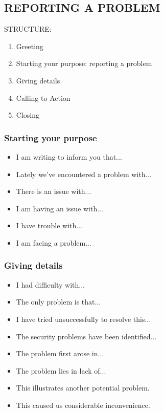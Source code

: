 \subsection{REPORTING A PROBLEM}

STRUCTURE:
\begin{enumerate}
\item Greeting
\item Starting your purpose: reporting a problem
\item Giving details
\item Calling to Action
\item Closing
\end{enumerate}
\subsubsection{Starting your purpose}
\begin{itemize}
\item I am writing to inform you that...
\item Lately we've encountered a problem with...
\item There is an issue with...
\item I am having an issue with...
\item I have trouble with...
\item I am facing a problem...
\end{itemize}
\subsubsection{Giving details}
\begin{itemize}
\item I had difficulty with...
\item The only problem is that...
\item I have tried unsuccessfully to resolve this...
\item The security problems have been identified...
\item The problem first arose in...
\item The problem lies in lack of...
\item This illustrates another potential problem.
\item This caused us considerable inconvenience.
\end{itemize}
